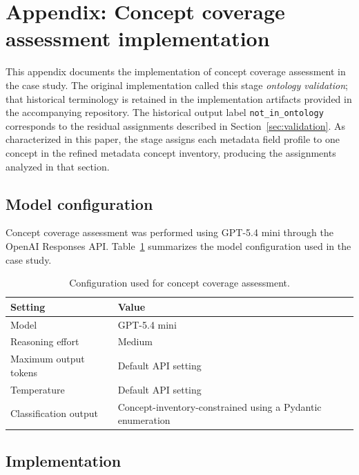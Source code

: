 \documentclass{article}
\begin{document}
\section{Appendix: Concept coverage assessment implementation}
\label{appendix:validation}

This appendix documents the implementation of concept coverage assessment in the case study. The original implementation called this stage \emph{ontology validation}; that historical terminology is retained in the implementation artifacts provided in the accompanying repository. The historical output label \texttt{not\_in\_ontology} corresponds to the residual assignments described in Section~\ref{sec:validation}. As characterized in this paper, the stage assigns each metadata field profile to one concept in the refined metadata concept inventory, producing the assignments analyzed in that section.

\subsection{Model configuration}

Concept coverage assessment was performed using GPT-5.4 mini through the OpenAI Responses API. Table~\ref{tab:ontology_validation_configuration} summarizes the model configuration used in the case study.

\begin{table}[!ht]
    \centering
    \caption{Configuration used for concept coverage assessment.}
    \label{tab:ontology_validation_configuration}
    \begin{tabular}{ll}
    \toprule
    \textbf{Setting} & \textbf{Value} \\
    \midrule
    Model & GPT-5.4 mini \\
    Reasoning effort & Medium \\
    Maximum output tokens & Default API setting \\
    Temperature & Default API setting \\
    Classification output & Concept-inventory-constrained using a Pydantic enumeration \\
    \bottomrule
    \end{tabular}
\end{table}

\subsection{Implementation}
\end{document}
